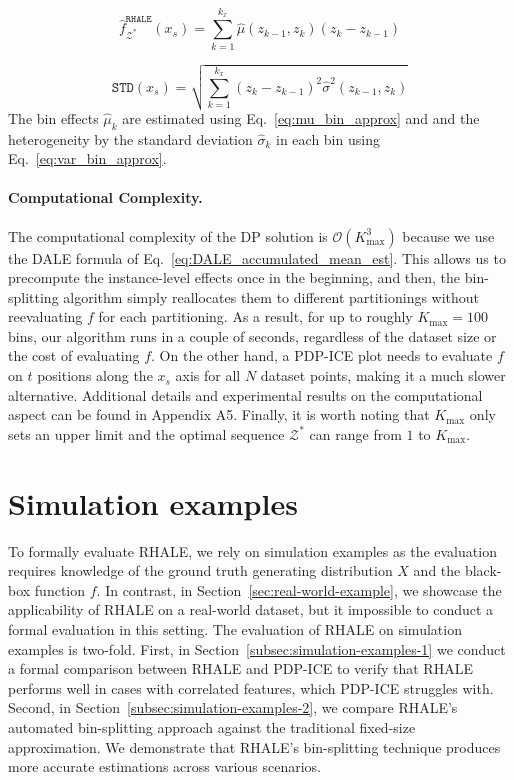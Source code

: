 \documentclass{ecai}  %
\newcommand{\paragraphb}{\vspace{-0.25cm}\paragraph}
\begin{document}
\begin{equation}
  \label{eq:RHALE}
  \hat{f}_{\mathcal{Z}^*}^{\mathtt{RHALE}}(x_s) = \sum_{k=1}^{k_x} \hat{\mu}(z_{k-1}, z_k)(z_k - z_{k-1})
\end{equation}

\begin{equation}
  \label{eq:SE}
  \mathtt{STD}(x_s) = \sqrt{\sum_{k=1}^{k_x} (z_k - z_{k-1})^2 \hat{\sigma}^2(z_{k-1}, z_k)}
  \end{equation}
%
The bin effects $\hat{\mu}_k$ are estimated using Eq.~\ref{eq:mu_bin_approx} and
and the heterogeneity by the standard deviation $\hat{\sigma}_k$ in each bin
using Eq.~\ref{eq:var_bin_approx}.

\paragraphb{Computational Complexity.}
The computational complexity of the DP solution is
\(\mathcal{O}(K_{\max}^3)\) because we use the DALE formula of
Eq.~\ref{eq:DALE_accumulated_mean_est}. This allows us to precompute
the instance-level effects once in the beginning, and then, the
bin-splitting algorithm simply reallocates them to different
partitionings without reevaluating \(f\) for each partitioning. As a
result, for up to roughly \(K_{\max} = 100\) bins, our algorithm runs
in a couple of seconds, regardless of the dataset size or the cost of
evaluating \(f\). On the other hand, a PDP-ICE plot needs to evaluate
\(f\) on \(t\) positions along the \(x_s\) axis for all \(N\) dataset
points, making it a much slower alternative. Additional details and
experimental results on the computational aspect can be found in
Appendix A5. Finally, it is worth noting that $K_{\max}$ only sets an
upper limit and the optimal sequence $\mathcal{Z}^*$ can range from
$1$ to $K_{\max}$.


\section{Simulation examples}
\label{sec:simulation-examples}

To formally evaluate RHALE, we rely on simulation examples as the
evaluation requires knowledge of the ground truth generating
distribution \(X\) and the black-box function \(f\). In contrast, in
Section~\ref{sec:real-world-example}, we showcase the applicability of
RHALE on a real-world dataset, but it impossible to conduct a formal
evaluation in this setting. The evaluation of RHALE on simulation
examples is two-fold. First, in
Section~\ref{subsec:simulation-examples-1} we conduct a formal
comparison between RHALE and PDP-ICE to verify that RHALE performs
well in cases with correlated features, which PDP-ICE struggles
with. Second, in Section~\ref{subsec:simulation-examples-2}, we compare
RHALE's automated bin-splitting approach against the traditional
fixed-size approximation. We demonstrate that RHALE's bin-splitting
technique produces more accurate estimations across various scenarios.
\end{document}
